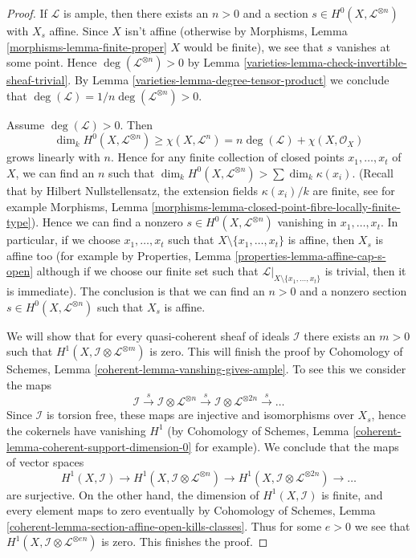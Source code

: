 \begin{proof}

If $\mathcal{L}$ is ample, then there exists an $n > 0$ and a section
$s \in H^0(X, \mathcal{L}^{\otimes n})$ with $X_s$ affine. Since
$X$ isn't affine (otherwise by
Morphisms, Lemma \ref{morphisms-lemma-finite-proper}
$X$ would be finite), we see that $s$ vanishes at some point.
Hence $\deg(\mathcal{L}^{\otimes n}) > 0$ by
Lemma \ref{varieties-lemma-check-invertible-sheaf-trivial}.
By Lemma \ref{varieties-lemma-degree-tensor-product}
we conclude that $\deg(\mathcal{L}) = 1/n\deg(\mathcal{L}^{\otimes n}) > 0$.

\medskip\noindent
Assume $\deg(\mathcal{L}) > 0$. Then
$$
\dim_k H^0(X, \mathcal{L}^{\otimes n}) \geq \chi(X, \mathcal{L}^n)
= n\deg(\mathcal{L}) + \chi(X, \mathcal{O}_X)
$$
grows linearly with $n$. Hence for any finite collection of closed
points $x_1, \ldots, x_t$ of $X$, we can find an $n$ such that
$\dim_k H^0(X, \mathcal{L}^{\otimes n}) > \sum \dim_k \kappa(x_i)$.
(Recall that by Hilbert Nullstellensatz, the extension fields
$\kappa(x_i)/k$ are finite, see for example
Morphisms, Lemma \ref{morphisms-lemma-closed-point-fibre-locally-finite-type}).
Hence we can find a nonzero $s \in H^0(X, \mathcal{L}^{\otimes n})$
vanishing in $x_1, \ldots, x_t$. In particular, if we choose
$x_1, \ldots, x_t$ such that $X \setminus \{x_1, \ldots, x_t\}$
is affine, then $X_s$ is affine too
(for example by Properties, Lemma \ref{properties-lemma-affine-cap-s-open}
although if we choose our finite set such that
$\mathcal{L}|_{X \setminus \{x_1, \ldots, x_t\}}$ is trivial, then
it is immediate). The conclusion is that we can find an $n > 0$
and a nonzero section $s \in H^0(X, \mathcal{L}^{\otimes n})$ such
that $X_s$ is affine.

\medskip\noindent
We will show that for every quasi-coherent sheaf of ideals $\mathcal{I}$
there exists an $m > 0$ such that
$H^1(X, \mathcal{I} \otimes \mathcal{L}^{\otimes m})$ is zero.
This will finish the proof by
Cohomology of Schemes, Lemma \ref{coherent-lemma-vanshing-gives-ample}.
To see this we consider the maps
$$
\mathcal{I} \xrightarrow{s}
\mathcal{I} \otimes \mathcal{L}^{\otimes n} \xrightarrow{s}
\mathcal{I} \otimes \mathcal{L}^{\otimes 2n} \xrightarrow{s} \ldots
$$
Since $\mathcal{I}$ is torsion free, these maps are injective and
isomorphisms over $X_s$, hence the cokernels have vanishing $H^1$
(by Cohomology of Schemes, Lemma
\ref{coherent-lemma-coherent-support-dimension-0} for example).
We conclude that the maps of vector spaces
$$
H^1(X, \mathcal{I}) \to
H^1(X, \mathcal{I} \otimes \mathcal{L}^{\otimes n}) \to
H^1(X, \mathcal{I} \otimes \mathcal{L}^{\otimes 2n}) \to \ldots
$$
are surjective. On the other hand, the dimension of $H^1(X, \mathcal{I})$
is finite, and every element maps to zero eventually by
Cohomology of Schemes, Lemma
\ref{coherent-lemma-section-affine-open-kills-classes}.
Thus for some $e > 0$ we see that
$H^1(X, \mathcal{I} \otimes \mathcal{L}^{\otimes en})$ is zero.
This finishes the proof.
\end{proof}

